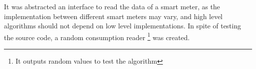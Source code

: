 
	It was abstracted an interface to read the data of a smart meter, as the implementation between different smart meters may vary, and high level algorithms should not depend on low level implementations. In spite of testing the source code, a random consumption reader \footnote{It outputs random values to test the algorithm} was created.
